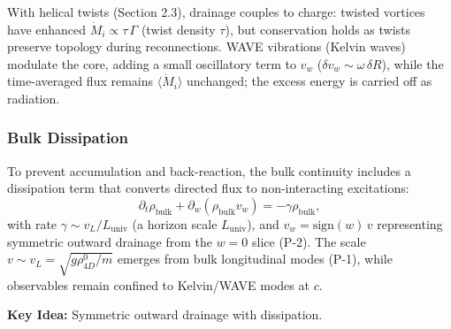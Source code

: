With helical twists (Section 2.3), drainage couples to charge: twisted vortices have enhanced $\dot M_i \propto \tau\,\Gamma$ (twist density $\tau$), but conservation holds as twists preserve topology during reconnections. WAVE vibrations (Kelvin waves) modulate the core, adding a small oscillatory term to $v_w$ ($\delta v_w \sim \omega\,\delta R$), while the time-averaged flux remains $\langle \dot M_i \rangle$ unchanged; the excess energy is carried off as radiation.

\subsubsection{Bulk Dissipation}
To prevent accumulation and back-reaction, the bulk continuity includes a dissipation term that converts directed flux to non-interacting excitations:
\begin{equation}
\partial_t \rho_{\text{bulk}} + \partial_w (\rho_{\text{bulk}} v_w) = -\gamma \rho_{\text{bulk}},
\end{equation}
with rate $\gamma \sim v_L/L_{\text{univ}}$ (a horizon scale $L_{\text{univ}}$), and $v_w=\mathrm{sign}(w)\,v$ representing symmetric outward drainage from the $w=0$ slice (P-2). The scale $v \sim v_L=\sqrt{g\rho_{4D}^0/m}$ emerges from bulk longitudinal modes (P-1), while observables remain confined to Kelvin/WAVE modes at $c$.

\textbf{Key Idea:} Symmetric outward drainage with dissipation.

